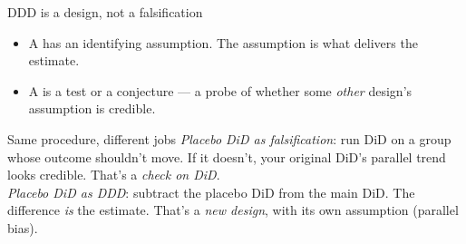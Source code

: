 \documentclass[aspectratio=169,11pt]{beamer}
\begin{document}
\begin{frame}{DDD is a design, not a falsification}
\vspace{0.4em}
\begin{itemize}
  \item A  has an identifying assumption. \;The assumption is what delivers the estimate.
  \item A  is a test or a conjecture --- a probe of whether some \textit{other} design's assumption is credible.
\end{itemize}
\vspace{0.6em}
\begin{block}{Same procedure, different jobs}
\small
\textit{Placebo DiD as falsification}: run DiD on a group whose outcome shouldn't move. If it doesn't, your original DiD's parallel trend looks credible. \;That's a \textit{check on DiD}. \\[0.3em]
\textit{Placebo DiD as DDD}: subtract the placebo DiD from the main DiD. The difference \textit{is} the estimate. \;That's a \textit{new design}, with its own assumption (parallel bias).
\end{block}
\vspace{0.3em}
\end{frame}

\end{document}
